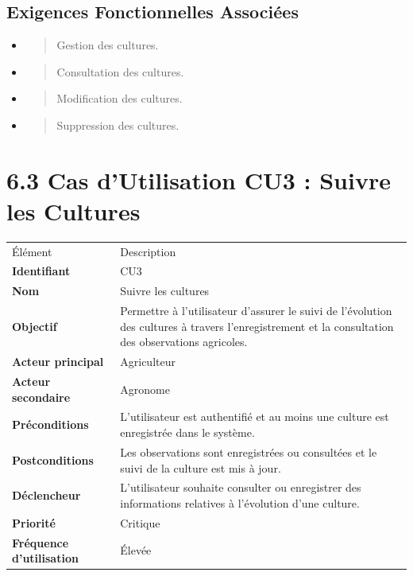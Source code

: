 \documentclass[
]{book}
\begin{document}
\hypertarget{exigences-fonctionnelles-associuxe9es-1}{%
\subsection{Exigences Fonctionnelles
Associées}\label{exigences-fonctionnelles-associuxe9es-1}}

\begin{itemize}
\item
  \begin{quote}
  Gestion des cultures.
  \end{quote}
\item
  \begin{quote}
  Consultation des cultures.
  \end{quote}
\item
  \begin{quote}
  Modification des cultures.
  \end{quote}
\item
  \begin{quote}
  Suppression des cultures.
  \end{quote}
\end{itemize}

\hypertarget{cas-dutilisation-cu3-suivre-les-cultures}{%
\section{6.3 Cas d'Utilisation CU3 : Suivre les
Cultures}\label{cas-dutilisation-cu3-suivre-les-cultures}}

\begin{longtable}[]{@{}ll@{}}
\toprule
\endhead
Élément & Description \\
\textbf{Identifiant} & CU3 \\
\textbf{Nom} & Suivre les cultures \\
\textbf{Objectif} & Permettre à l'utilisateur d'assurer le suivi de
l'évolution des cultures à travers l'enregistrement et la consultation
des observations agricoles. \\
\textbf{Acteur principal} & Agriculteur \\
\textbf{Acteur secondaire} & Agronome \\
\textbf{Préconditions} & L'utilisateur est authentifié et au moins une
culture est enregistrée dans le système. \\
\textbf{Postconditions} & Les observations sont enregistrées ou
consultées et le suivi de la culture est mis à jour. \\
\textbf{Déclencheur} & L'utilisateur souhaite consulter ou enregistrer
des informations relatives à l'évolution d'une culture. \\
\textbf{Priorité} & Critique \\
\textbf{Fréquence d'utilisation} & Élevée \\
\bottomrule
\end{longtable}
\end{document}
